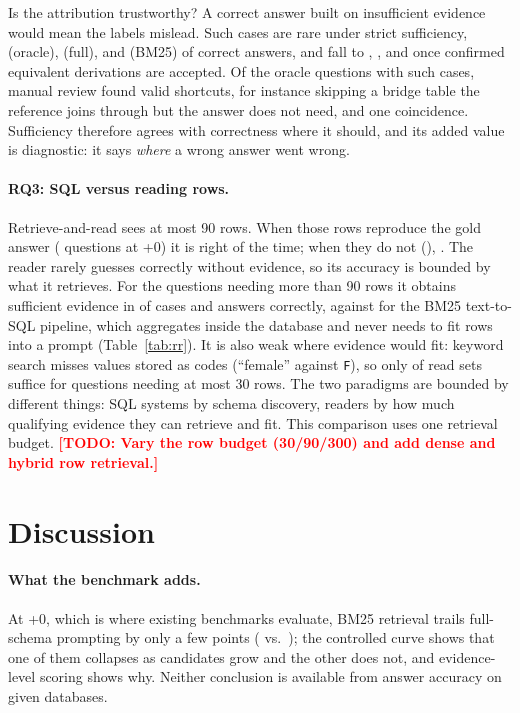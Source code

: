 \documentclass[11pt]{article}
\newif\ifdraft \drafttrue   %
\newcommand{\todo}[1]{\ifdraft\textcolor{red}{\textbf{[TODO: #1]}}\fi}
\begin{document}
Is the attribution trustworthy? A correct answer built on insufficient evidence would mean the labels mislead. Such cases are rare under strict sufficiency, \orCorrectInsuff{} (oracle), \fsCorrectInsuff{} (full), and \bmCorrectInsuff{} (BM25) of correct answers, and fall to \orCorrectInsuffEq{}, \fsCorrectInsuffEq{}, and \bmCorrectInsuffEq{} once confirmed equivalent derivations are accepted. Of the \nOrShortcutCases{} oracle questions with such cases, manual review found \nOrShortcutValid{} valid shortcuts, for instance skipping a bridge table the reference joins through but the answer does not need, and one coincidence. Sufficiency therefore agrees with correctness where it should, and its added value is diagnostic: it says \emph{where} a wrong answer went wrong.


\paragraph{RQ3: SQL versus reading rows.} Retrieve-and-read sees at most 90 rows. When those rows reproduce the gold answer (\rrSuffN{} questions at +0) it is right \rrSuffAccPct{} of the time; when they do not (\rrNotSuffN{}), \rrNotSuffAccPct{}. The reader rarely guesses correctly without evidence, so its accuracy is bounded by what it retrieves. For the \rrBigN{} questions needing more than 90 rows it obtains sufficient evidence in \rrBigSuffPct{} of cases and answers \rrBigAccPct{} correctly, against \bmBigAccPct{} for the BM25 text-to-SQL pipeline, which aggregates inside the database and never needs to fit rows into a prompt (Table~\ref{tab:rr}). It is also weak where evidence would fit: keyword search misses values stored as codes (``female'' against \texttt{F}), so only \rrSmallSuffPct{} of read sets suffice for questions needing at most 30 rows. The two paradigms are bounded by different things: SQL systems by schema discovery, readers by how much qualifying evidence they can retrieve and fit. This comparison uses one retrieval budget. \todo{Vary the row budget (30/90/300) and add dense and hybrid row retrieval.}

\section{Discussion}\label{sec:discussion}
\paragraph{What the benchmark adds.} At +0, which is where existing benchmarks evaluate, BM25 retrieval trails full-schema prompting by only a few points (\bmValueAtZero{} vs.\ \gmFsZeroCommon{}); the controlled curve shows that one of them collapses as candidates grow and the other does not, and evidence-level scoring shows why. Neither conclusion is available from answer accuracy on given databases.
\end{document}
